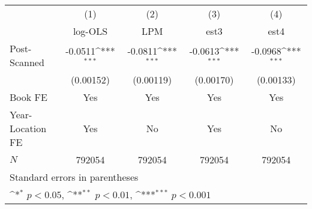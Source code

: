 {
\def\sym#1{\ifmmode^{#1}\else\(^{#1}\)\fi}
\begin{tabular}{l*{4}{c}}
\hline\hline
            &\multicolumn{1}{c}{(1)}&\multicolumn{1}{c}{(2)}&\multicolumn{1}{c}{(3)}&\multicolumn{1}{c}{(4)}\\
            &\multicolumn{1}{c}{log-OLS}&\multicolumn{1}{c}{LPM}&\multicolumn{1}{c}{est3}&\multicolumn{1}{c}{est4}\\
\hline
Post-Scanned&     -0.0511\sym{***}&     -0.0811\sym{***}&     -0.0613\sym{***}&     -0.0968\sym{***}\\
            &   (0.00152)         &   (0.00119)         &   (0.00170)         &   (0.00133)         \\
\hline
Book FE     &         Yes         &         Yes         &         Yes         &         Yes         \\
Year-Location FE&         Yes         &          No         &         Yes         &          No         \\
\(N\)       &      792054         &      792054         &      792054         &      792054         \\
\hline\hline
\multicolumn{5}{l}{\footnotesize Standard errors in parentheses}\\
\multicolumn{5}{l}{\footnotesize \sym{*} \(p<0.05\), \sym{**} \(p<0.01\), \sym{***} \(p<0.001\)}\\
\end{tabular}
}
